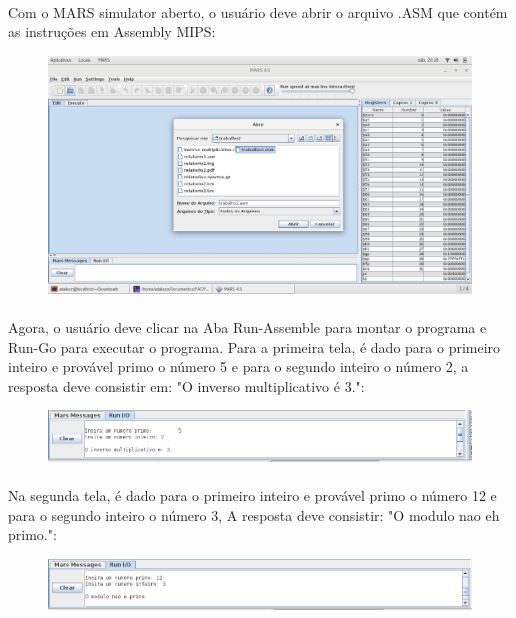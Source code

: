 \documentclass[a4paper, 12pt]{article}
\begin{document}
        \paragraph{}    Com o MARS simulator aberto, o usu\'ario deve abrir o arquivo .ASM que cont\'em as instru\c{c}\~oes em Assembly MIPS:
        \begin{figure}[H]
        	\centering
        	\includegraphics[scale=0.3]{img3.png}
        \end{figure}
        \paragraph{}    Agora, o usu\'ario deve clicar na Aba Run-Assemble para montar o programa e Run-Go para executar o programa. Para a primeira tela, \'e dado para o primeiro inteiro e prov\'avel primo o n\'umero 5 e para o segundo inteiro o n\'umero 2, a resposta deve consistir em: "O inverso multiplicativo \'e 3.":
        \begin{figure}[H]
        	\centering
        	\includegraphics[scale=0.5]{img4.png}
        \end{figure}
        \paragraph{}    Na segunda tela, \'e dado para o primeiro inteiro e prov\'avel primo o n\'umero 12 e para o segundo inteiro o n\'umero 3, A resposta deve consistir: "O modulo nao eh primo.":
        \begin{figure}[H]
        	\centering
        	\includegraphics[scale=0.5]{img5.png}
        \end{figure}
        \paragraph{}    
\end{document}
